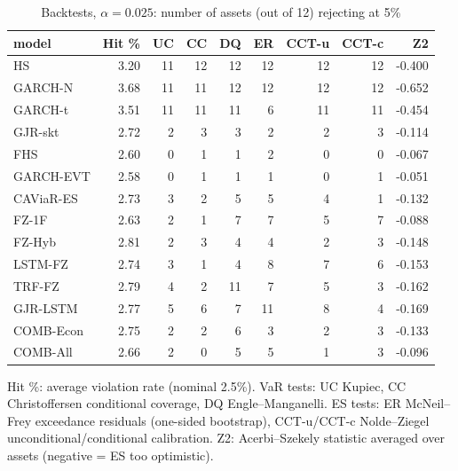 \begin{table}[htbp]
\centering
\footnotesize
\caption{Backtests, $\alpha=0.025$: number of assets (out of 12) rejecting at 5\%}
\label{tab:bt_a025}
\begin{tabular}{lrrrrrrrr}
\toprule
model & Hit \% & UC & CC & DQ & ER & CCT-u & CCT-c & Z2 \\
\midrule
HS & 3.20 & 11 & 12 & 12 & 12 & 12 & 12 & -0.400 \\
GARCH-N & 3.68 & 11 & 11 & 12 & 12 & 12 & 12 & -0.652 \\
GARCH-t & 3.51 & 11 & 11 & 11 & 6 & 11 & 11 & -0.454 \\
GJR-skt & 2.72 & 2 & 3 & 3 & 2 & 2 & 3 & -0.114 \\
FHS & 2.60 & 0 & 1 & 1 & 2 & 0 & 0 & -0.067 \\
GARCH-EVT & 2.58 & 0 & 1 & 1 & 1 & 0 & 1 & -0.051 \\
CAViaR-ES & 2.73 & 3 & 2 & 5 & 5 & 4 & 1 & -0.132 \\
FZ-1F & 2.63 & 2 & 1 & 7 & 7 & 5 & 7 & -0.088 \\
FZ-Hyb & 2.81 & 2 & 3 & 4 & 4 & 2 & 3 & -0.148 \\
LSTM-FZ & 2.74 & 3 & 1 & 4 & 8 & 7 & 6 & -0.153 \\
TRF-FZ & 2.79 & 4 & 2 & 11 & 7 & 5 & 3 & -0.162 \\
GJR-LSTM & 2.77 & 5 & 6 & 7 & 11 & 8 & 4 & -0.169 \\
COMB-Econ & 2.75 & 2 & 2 & 6 & 3 & 2 & 3 & -0.133 \\
COMB-All & 2.66 & 2 & 0 & 5 & 5 & 1 & 3 & -0.096 \\
\bottomrule
\end{tabular}
\par\smallskip\parbox{\linewidth}{\scriptsize Hit \%: average violation rate (nominal 2.5\%). VaR tests: UC Kupiec, CC Christoffersen conditional coverage, DQ Engle--Manganelli. ES tests: ER McNeil--Frey exceedance residuals (one-sided bootstrap), CCT-u/CCT-c Nolde--Ziegel unconditional/conditional calibration. Z2: Acerbi--Szekely statistic averaged over assets (negative = ES too optimistic).}
\end{table}